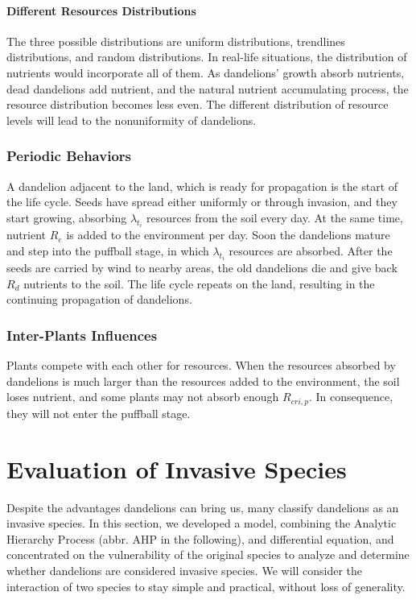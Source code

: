 \documentclass[12pt]{article}
\begin{document}
\paragraph{Different Resources Distributions}
The three possible distributions are uniform distributions, trendlines distributions, and random distributions. In real-life situations, the distribution of nutrients would incorporate all of them. As dandelions' growth absorb nutrients, dead dandelions add nutrient, and the natural nutrient accumulating process, the resource distribution becomes less even. The different distribution of resource levels will lead to the nonuniformity of dandelions. 

\subsubsection{Periodic Behaviors}
A dandelion adjacent to the land, which is ready for propagation is the start of the life cycle. Seeds have spread either uniformly or through invasion, and they start growing, absorbing $\lambda_{t_i}$ resources from the soil every day. At the same time, nutrient $R_e$ is added to the environment per day. Soon the dandelions mature and step into the puffball stage, in which $\lambda_{t_i}$ resources are absorbed. After the seeds are carried by wind to nearby areas, the old dandelions die and give back $R_d$ nutrients to the soil. The life cycle repeats on the land, resulting in the continuing propagation of dandelions. 

\subsubsection{Inter-Plants Influences}
Plants compete with each other for resources. When the resources absorbed by dandelions is much larger than the resources added to the environment, the soil loses nutrient, and some plants may not absorb enough $R_{cri,p}$. In consequence, they will not enter the puffball stage. 

\section{Evaluation of Invasive Species}
Despite the advantages dandelions can bring us, many classify dandelions as an invasive species. In this section, we developed a model, combining the Analytic Hierarchy Process (abbr. AHP in the following), and differential equation, and concentrated on the vulnerability of the original species to analyze and determine whether dandelions are considered invasive species. We will consider the interaction of two species to stay simple and practical, without loss of generality.
\end{document}
